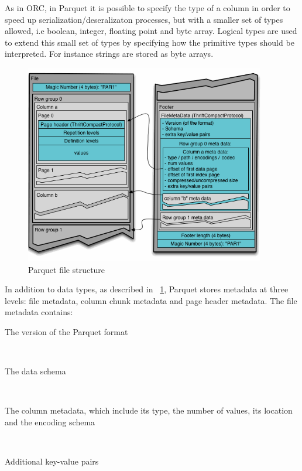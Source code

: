 \documentclass[10pt, a4paper]{report}
\begin{document}
As in ORC, in Parquet it is possible to specify the type of a column in order to speed up serialization/deseralizaton processes, but with a smaller set of types allowed, i.e boolean, integer, floating point and byte array. Logical types are used to extend this small set of types by specifying how the primitive types should be interpreted. For instance strings are stored as byte arrays.

\begin{figure}
	\centering
	\includegraphics[width=10.5cm]{./assets/img/parquet.png}
	\caption{Parquet file structure}
	\label{fig:parque_file_structuret}
	\vspace{0.5cm}
\end{figure}

In addition to data types, as described in \figurename~\ref{fig:parque_file_structuret}, Parquet stores metadata at three levels: file metadata, column chunk metadata and page header metadata. The file metadata contains: \\

\begin{itemize}
	\begin{minipage}{0.92\textwidth}
		\item The version of the Parquet format  \\
	\end{minipage} \\
	\begin{minipage}{0.92\textwidth}
		\item The data schema \\
	\end{minipage} \\
	\begin{minipage}{0.92\textwidth}
		\item The column metadata, which include its type, the number of values, its location and the encoding schema \\
	\end{minipage} \\
	\begin{minipage}{0.92\textwidth}
		\item Additional key-value pairs \\
	\end{minipage}
\end{itemize}
\end{document}
